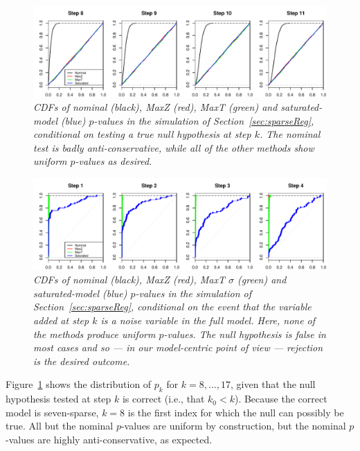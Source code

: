 \documentclass{article}
\begin{document}
\begin{figure}[h]
  \centering
  \includegraphics[width=1\textwidth]{figs/simulation_snr_5_alpha_05_null_true.pdf}
  \caption{\em  CDFs of nominal (black), MaxZ (red), MaxT (green) and  saturated-model (blue) $p$-values in the simulation of Section~\ref{sec:sparseReg}, conditional on testing a true null hypothesis at step $k$.  The nominal test is badly anti-conservative, while all of the other methods  show uniform $p$-values as desired.}
  \label{fig:simulation_null_true}
\end{figure}

\begin{figure}[h]
  \centering
  \includegraphics[width=1\textwidth]{figs/simulation_snr_5_alpha_05_noise_var.pdf}
  \caption{\em CDFs of nominal (black), MaxZ (red), MaxT $\sigma$ (green) and  saturated-model (blue) $p$-values in the simulation of Section~\ref{sec:sparseReg}, conditional on the event that the variable added at step $k$ is a noise variable in the full model. Here, none of the methods produce uniform $p$-values. The null hypothesis is false in most cases and so --- in our model-centric point of view --- rejection is the desired outcome.}
  \label{fig:simulation_noise_var}
\end{figure}

Figure~\ref{fig:simulation_null_true} shows the distribution of $p_k$ for $k = 8, \ldots, 17$, given that the null hypothesis tested at step $k$ is correct (i.e., that $k_0< k$). Because the correct model is seven-sparse, $k=8$ is the first index for which the null can possibly be true. All but the nominal $p$-values are uniform by construction, but the nominal $p$-values are highly anti-conservative, as expected.
\end{document}
